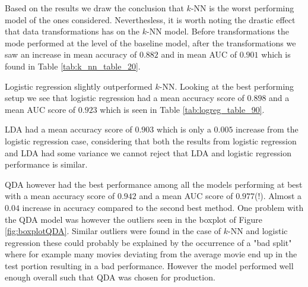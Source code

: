 \documentclass[../../project.tex]{subfiles}
\begin{document}
	Based on the results we draw the conclusion that $k$-NN is the worst performing model of the ones considered. Neverthesless, it is worth noting the drastic effect that data transformations has on the $k$-NN model. Before transformations the mode performed at the level of the baseline model, after the transformations we saw an increase in mean accuracy of $0.882$ and in mean AUC of $0.901$ which is found in Table \ref{tab:k_nn_table_20}.
	
	Logistic regression slightly outperformed $k$-NN. Looking at the best performing setup we see that logistic regression had a mean accuracy score of $0.898$ and a mean AUC score of $0.923$ which is seen in Table \ref{tab:logreg_table_90}.  
	
	LDA had a mean accuracy score of $0.903$ which is only a $0.005$ increase from the logistic regression case, considering that both the results from logistic regression and LDA had some variance we cannot reject that LDA and logistic regression performance is similar.
	
	QDA however had the best performance among all the models performing at best with a mean accuracy score of $0.942$ and a mean AUC score of $0.977$(!). Almost a $0.04$ increase in accuracy compared to the second best method. One problem with the QDA model was however the outliers seen in the boxplot of Figure \ref{fig:boxplotQDA}. Similar outliers were found in the case of $k$-NN and logistic regression these could probably be explained by the occurrence of a "bad split" where for example many movies deviating from the average movie end up in the test portion resulting in a bad performance. However the model performed well enough overall such that QDA was chosen for production.
	
\end{document}

